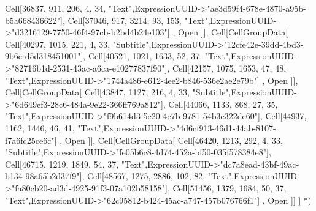 {{Cell[36837, 911, 206, 4, 34, "Text",ExpressionUUID->"ae3d59f4-678e-4870-a95b-b5a668436622"],
Cell[37046, 917, 3214, 93, 153, "Text",ExpressionUUID->"d3216129-7750-46f4-97cb-b2bd4b24e103"]
}, Open  ]],
Cell[CellGroupData[{
Cell[40297, 1015, 221, 4, 33, "Subtitle",ExpressionUUID->"12cfe42e-39dd-4bd3-9b6c-d5d318451001"],
Cell[40521, 1021, 1633, 52, 37, "Text",ExpressionUUID->"82716b1d-2531-43ac-a6ca-e10277837f90"],
Cell[42157, 1075, 1653, 47, 48, "Text",ExpressionUUID->"1744a486-e612-4ee2-b846-536e2ae2e79b"]
}, Open  ]],
Cell[CellGroupData[{
Cell[43847, 1127, 216, 4, 33, "Subtitle",ExpressionUUID->"6d649ef3-28c6-484a-9e22-366ff769a812"],
Cell[44066, 1133, 868, 27, 35, "Text",ExpressionUUID->"f9b614d3-5c20-4e7b-9781-54b3e322de60"],
Cell[44937, 1162, 1446, 46, 41, "Text",ExpressionUUID->"4d6cf913-46d1-44ab-8107-f7a6fc25ce6c"]
}, Open  ]],
Cell[CellGroupData[{
Cell[46420, 1213, 292, 4, 33, "Subtitle",ExpressionUUID->"fe05b6c8-4d74-452a-bf50-035f578384e8"],
Cell[46715, 1219, 1849, 54, 37, "Text",ExpressionUUID->"dc7a8ead-43bf-49ac-b134-98a65b2d37f9"],
Cell[48567, 1275, 2886, 102, 82, "Text",ExpressionUUID->"fa80cb20-ad3d-4925-91f3-07a102b58158"],
Cell[51456, 1379, 1684, 50, 37, "Text",ExpressionUUID->"62c95812-b424-45ac-a747-457b076766f1"]
}, Open  ]]
}
]
*)


